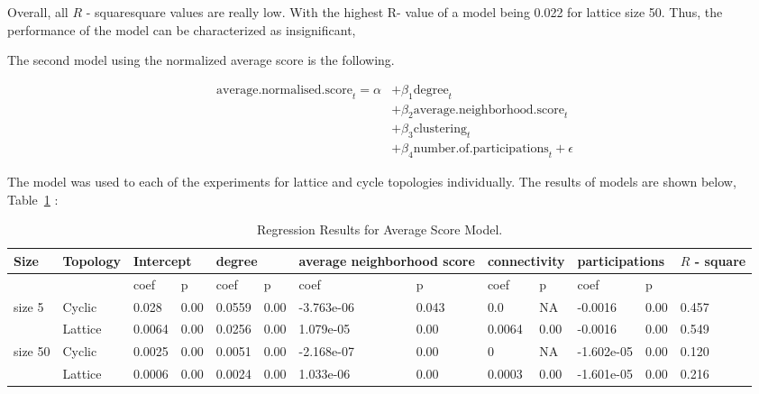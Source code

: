 Overall, all \(R\) - squaresquare values  are really low. With the highest R- value of a
model being 0.022 for lattice size 50. Thus, the performance of the model can
be characterized as insignificant,

The second model using the normalized average score is the following.

\begin{align}
\mathrm{average.normalised.score}_{t} = \alpha
    &+ \beta_{1}  \mathrm{degree}_{t} \\
    &+ \beta_{2}  \mathrm{average.neighborhood.score}_{t}    \\
    &+ \beta_{3}  \mathrm{clustering}_{t} \\
    &+ \beta_{4}  \mathrm{number.of.participations}_{t} + \epsilon
\end{align}

The model was used to each of the experiments for lattice and cycle topologies
individually. The results of models are shown below, Table~\ref{regression-average} :
\begin{table}[H]
\centering
\begin{adjustbox}{width=1\textwidth}
\small
\begin{tabular}{@{}|l|l|l|l|l|l|l|l|l|l|l|l|l|@{}}
\toprule
Size & Topology & \multicolumn{2}{l|}{Intercept} & \multicolumn{2}{l|}{degree} & \multicolumn{2}{l|}{average neighborhood score} & \multicolumn{2}{l|}{connectivity} & \multicolumn{2}{l|}{participations} & \(R\) - square \\ \midrule
        &          & coef            & p            & coef          & p           & coef                      & p                    & coef             & p              & coef                & p             &          \\ \midrule
size 5  & Cyclic    & 0.028           & 0.00         & 0.0559        & 0.00        & -3.763e-06                & 0.043                & 0.0              & NA             & -0.0016             & 0.00          & 0.457    \\ \midrule
        & Lattice  & 0.0064          & 0.00         & 0.0256        & 0.00        & 1.079e-05                 & 0.00                 & 0.0064           & 0.00           & -0.0016             & 0.00          & 0.549    \\ \midrule
size 50 & Cyclic    & 0.0025          & 0.00         & 0.0051        & 0.00        & -2.168e-07                & 0.00                 & 0                & NA             & -1.602e-05          & 0.00          & 0.120    \\ \midrule
        & Lattice  & 0.0006          & 0.00         & 0.0024        & 0.00        & 1.033e-06                 & 0.00                 & 0.0003           & 0.00           & -1.601e-05          & 0.00          & 0.216    \\ \bottomrule
\end{tabular}
\end{adjustbox}
\caption{Regression Results for Average Score Model.}
\label{regression-average}
\end{table}

